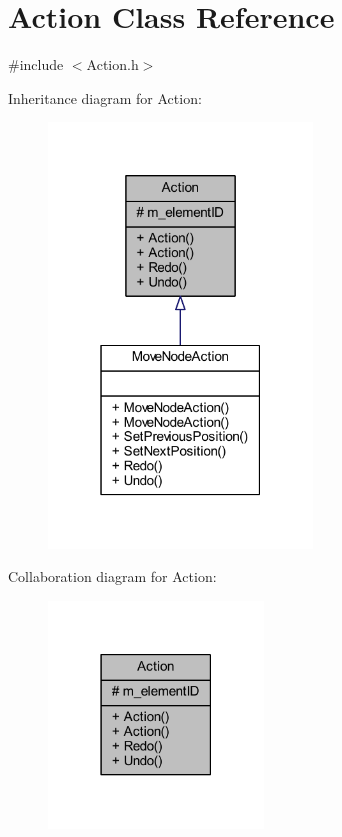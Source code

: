 \hypertarget{class_action}{}\section{Action Class Reference}
\label{class_action}


{\ttfamily \#include $<$Action.\+h$>$}



Inheritance diagram for Action\+:\nopagebreak
\begin{figure}[H]
\begin{center}
\leavevmode
\includegraphics[width=199pt]{class_action__inherit__graph}
\end{center}
\end{figure}


Collaboration diagram for Action\+:\nopagebreak
\begin{figure}[H]
\begin{center}
\leavevmode
\includegraphics[width=162pt]{class_action__coll__graph}
\end{center}
\end{figure}
